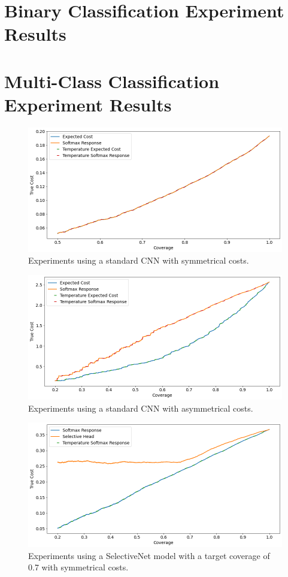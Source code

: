 \section{Binary Classification Experiment Results}


\section{Multi-Class Classification Experiment Results}
\begin{figure}[h]
	\includegraphics[width=\textwidth]{images/multi-class/cnn-sym.png}
	\caption*{Experiments using a standard CNN with symmetrical costs.}
\end{figure}

\begin{figure}[h]
	\includegraphics[width=\textwidth]{images/multi-class/cnn-asym.png}
	\caption*{Experiments using a standard CNN with asymmetrical costs.}
\end{figure}

\begin{figure}[h]
	\includegraphics[width=\textwidth]{images/multi-class/sn0.7-sym.png}
	\caption*{Experiments using a SelectiveNet model with a target coverage of 0.7 with symmetrical costs.}
\end{figure}

